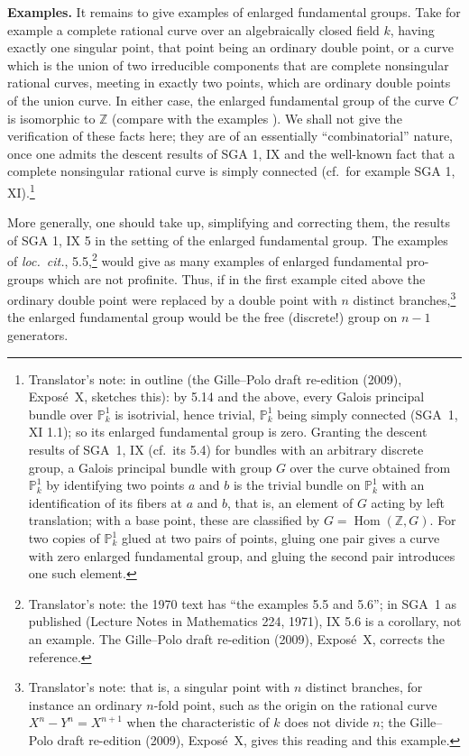 \par\medskip\noindent
\textbf{Examples.}\enspace
It remains to give examples of enlarged fundamental groups. Take for example
a complete rational curve over an algebraically closed field \(k\), having
exactly one singular point, that point being an ordinary double point, or a
curve which is the union of two irreducible components that are complete
nonsingular rational curves, meeting in exactly two points, which are
ordinary double points of the union curve. In either case, the enlarged
fundamental group of the curve \(C\) is isomorphic to \(\mathbb Z\) (compare
with the examples ). We shall not give the verification of these facts
here; they are of an essentially ``combinatorial'' nature, once one admits
the descent results of SGA 1, IX and the well-known fact that a complete
nonsingular rational curve is simply connected (cf.\ for example SGA 1,
XI).\footnote{Translator's note: in outline (the Gille--Polo draft
re-edition (2009), Expos\'e~X, sketches this): by 5.14 and the above, every
Galois principal bundle over \(\mathbb P^1_k\) is isotrivial, hence trivial,
\(\mathbb P^1_k\) being simply connected (SGA~1, XI 1.1); so its enlarged
fundamental group is zero. Granting the descent results of SGA~1, IX (cf.\
its 5.4) for bundles with an arbitrary discrete group, a Galois principal
bundle with group \(G\) over the curve obtained from \(\mathbb P^1_k\) by
identifying two points \(a\) and \(b\) is the trivial bundle on
\(\mathbb P^1_k\) with an identification of its fibers at \(a\) and \(b\),
that is, an element of \(G\) acting by left translation; with a base point,
these are classified by \(G=\operatorname{Hom}(\mathbb Z,G)\). For two copies
of \(\mathbb P^1_k\) glued at two pairs of points, gluing one pair gives a
curve with zero enlarged fundamental group, and gluing the second pair
introduces one such element.}

More generally, one should take up, simplifying and correcting them, the
results of SGA 1, IX 5 in the setting of the enlarged fundamental group.
The examples of \emph{loc.\ cit.}, 5.5,\footnote{Translator's note: the 1970
text has ``the examples 5.5 and 5.6''; in SGA~1 as published (Lecture Notes
in Mathematics 224, 1971), IX 5.6 is a corollary, not an example. The
Gille--Polo draft re-edition (2009), Expos\'e~X, corrects the reference.}
would give as many examples of enlarged fundamental pro-groups which are not
profinite. Thus, if in the first example cited above the ordinary double
point were replaced by a double point with \(n\) distinct
branches,\footnote{Translator's note: that is, a singular point with \(n\)
distinct branches, for instance an ordinary \(n\)-fold point, such as the
origin on the rational curve \(X^n-Y^n=X^{n+1}\) when the characteristic of
\(k\) does not divide \(n\); the Gille--Polo draft re-edition (2009),
Expos\'e~X, gives this reading and this example.} the enlarged fundamental
group would be the free (discrete!) group on \(n-1\) generators.
